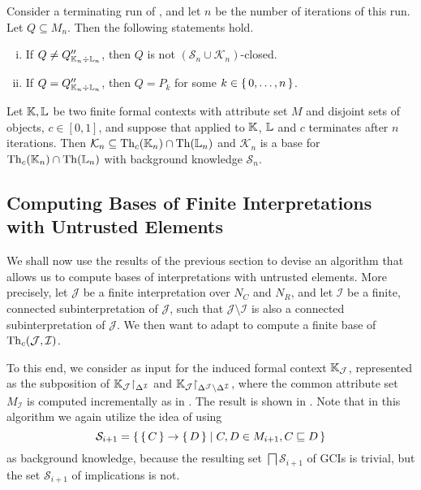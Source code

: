 \begin{Proposition}
  Consider a terminating run of
  , and let $n$ be the number
  of iterations of this run.  Let $Q \subseteq M_{n}$.  Then the following statements
  hold.
  \begin{enumerate}[i. ]
  \item If $Q \neq Q_{{\mathbb{K}}_{n} \div {\ensuremath{\mathbb{L}}}_{n}}''$, then $Q$ is not $(\mathcal{S}_{n} \cup
    \mathcal{K}_{n})$-closed.
  \item If $Q = Q_{{\mathbb{K}}_{n} \div {\ensuremath{\mathbb{L}}}_{n}}''$, then $Q = P_{k}$ for some $k \in {\ensuremath{\{\,
      0, \dots, n \,\}}}$.
  \end{enumerate}
\end{Proposition}
\begin{Theorem}
  \label{thm:confident-bases-with-growing-sets-of-attributes-and-trusted-objects}
  Let ${\mathbb{K}}, {\mathbb{L}}$ be two finite formal contexts with attribute set $M$ and disjoint
  sets of objects, $c \in [0,1]$, and suppose that
   applied to ${\mathbb{K}}$, ${\mathbb{L}}$ and $c$ terminates after $n$ iterations.  Then $\mathcal{K}_{n} \subseteq
  \operatorname{Th}_{c}({\mathbb{K}}_{n}) \cap \operatorname{Th}({\mathbb{L}}_{n})$ and $\mathcal{K}_{n}$ is a base for
  $\operatorname{Th}_{c}({\mathbb{K}}_{n}) \cap \operatorname{Th}({\mathbb{L}}_{n})$ with background knowledge $\mathcal{S}_{n}$.
\end{Theorem}

\subsection{Computing Bases of Finite Interpretations with Untrusted Elements}
\label{sec:expl-conf-gcis}

We shall now use the results of the previous section to devise an algorithm that allows us
to compute bases of interpretations with untrusted elements.  More precisely, let
$\mathcal{J}$ be a finite interpretation over $N_{C}$ and $N_{R}$, and let $\mathcal{I}$
be a finite, connected subinterpretation of $\mathcal{J}$, such that $\mathcal{J}
\setminus \mathcal{I}$ is also a connected subinterpretation of $\mathcal{J}$.  We then
want to adapt  to compute a
finite base of $\operatorname{Th}_{c}(\mathcal{J}, \mathcal{I})$.

To this end, we consider as input for
 the induced formal context
${\mathbb{K}}_{\mathcal{J}}$, represented as the subposition of ${\mathbb{K}}_{\mathcal{J}}
\mathord{\upharpoonright}_{\Delta^{\mathcal{I}}}$ and ${\mathbb{K}}_{\mathcal{J}}
\mathord{\upharpoonright}_{\Delta^{\mathcal{J}} \setminus \Delta^{\mathcal{I}}}$, where the common
attribute set $M_{\mathcal{I}}$ is computed incrementally as in
.  The result is shown in
.  Note that in this algorithm we again
utilize the idea of using
\begin{equation*}
  \mathcal{S}_{i+1} = {\{\, {\{\, C \,\}} \to {\ensuremath{\{\, D \,\}}} \mid C, D \in M_{i+1}, C \sqsubseteq D \,\}}
\end{equation*}
as background knowledge, because the resulting set $\bigsqcap \mathcal{S}_{i+1}$ of GCIs
is trivial, but the set $\mathcal{S}_{i+1}$ of implications is not.

